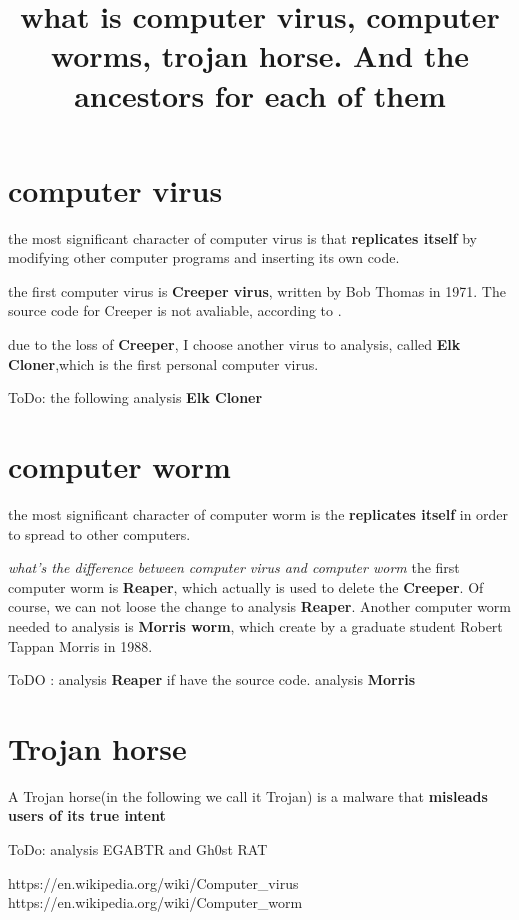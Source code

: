 \documentclass{article}
\title{what is computer virus, computer worms, trojan horse. And the ancestors for each of them}
\begin{document}
\maketitle

\section{computer virus}
the most significant character of computer virus is that \textbf{replicates itself} by modifying other computer programs and inserting its own code. 

the first computer virus is \textbf{Creeper virus}, written by Bob Thomas in 1971. The source code for Creeper is not avaliable, according to \cite{website:http://lists.project-wombat.org/pipermail/project-wombat-project-wombat.org/2011-November/006898.html}.

due to the loss of \textbf{Creeper}, I choose another virus to analysis, called \textbf{Elk Cloner},which is the first personal computer virus.

ToDo: the following analysis \textbf{Elk Cloner}

\section{computer worm}
the most significant character of computer worm is the \textbf{replicates itself} in order to spread to other computers.

\emph{what's the difference between computer virus and computer worm}
the first computer worm is \textbf{Reaper}, which actually is used to delete the \textbf{Creeper}. Of course, we can not loose the change to analysis \textbf{Reaper}. Another computer worm needed to analysis is \textbf{Morris worm}, which create by a graduate student Robert Tappan Morris in 1988.

ToDO : analysis \textbf{Reaper} if have the source code. analysis \textbf{Morris}

\section{Trojan horse}

A Trojan horse(in the following we call it Trojan) is a malware that \textbf{ misleads users of its true intent }

ToDo: analysis EGABTR and Gh0st RAT


https://en.wikipedia.org/wiki/Computer_virus
https://en.wikipedia.org/wiki/Computer_worm
\end{document}
